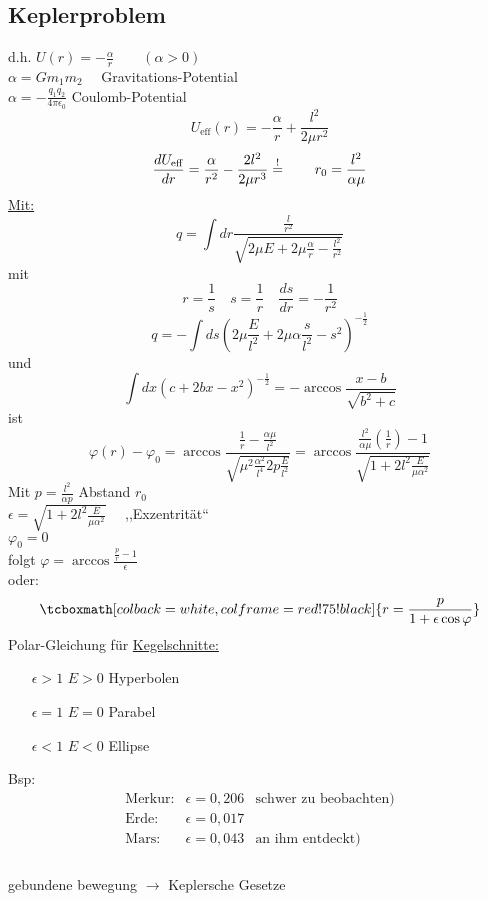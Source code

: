 \documentclass[titlepage,12pt,a4paper,ngerman]{report}
\newcommand{\tx}[1]{\textrm{#1}}
\newcommand{\rmbox}[1]{\tcboxmath[colback=white,colframe=red!75!black]{#1}} %
\renewcommand{\boxed}{\rmbox}
\begin{document}
{\subsection{Keplerproblem}
d.h. $U(r) = - \frac{\alpha}{r} \qquad (\alpha > 0)$\\
$ \alpha = G m_1 m_2 \quad  $  Gravitations-Potential\\
$ \alpha = - \frac{q_1 q_2}{4 \pi \epsilon_0} $ Coulomb-Potential\\
$$U_{\tx{eff}} (r) = -\frac{\alpha}{r} + \frac{l^2}{2 \mu r^2} $$
$$\frac{d U_{\tx{eff}}}{dr} = \frac{\alpha}{r^2} - \frac{2 l^2}{2 \mu r^3} \buildrel ! \over = \qquad r_0 = \frac{l^2}{\alpha \mu}$$
\underline{Mit:}
$$q = \int dr \frac{\frac{l}{r^2}}{\sqrt{2 \mu E + 2 \mu \frac{\alpha}{r} - \frac{l^2}{r^2}}}$$
mit
$$ r = \frac{1}{s} \quad s = \frac{1}{r} \quad \frac{ds}{dr} = - \frac{1}{r^2}$$
$$ q = - \int ds (2\mu \frac{E}{l^2} + 2 \mu \alpha \frac{s}{l^2} - s^2) ^{-\frac{1}{2}}$$
und 
$$ \int dx (c+2bx-x^2)^{-\frac{1}{2}} = - \arccos \frac{x-b}{\sqrt{b^2 + c}}$$
ist
$$ \varphi(r) - \varphi_0 = \arccos \frac{\frac{1}{r} - \frac{\alpha \mu}{l^2}}{\sqrt{\mu^2 \frac{\alpha^2}{l^4} 2 p \frac{E}{l^2}}} = \arccos \frac{\frac{l^2}{\alpha \mu} (\frac{1}{r}) - 1}{\sqrt{1+2l^2 \frac{E}{\mu \alpha^2}}}$$
Mit $ p = \frac{l^2}{\alpha p} $ Abstand $ r_0 $\\
$ \epsilon = \sqrt{1 + 2l^2 \frac{E}{\mu \alpha^2}} \quad$ ,,Exzentrität``\\
$ \varphi_0 = 0 $\\
folgt $  \varphi = \arccos\frac{\frac{p}{r}-1}{\epsilon} $\\
oder:
$$\boxed{ r = \frac{p}{1 + \epsilon \cos \varphi}}$$
Polar-Gleichung für \underline{Kegelschnitte:}
\begin{itemize}
	\item[$ \epsilon > 1 $] $ E>0 $ Hyperbolen
	\item[$ \epsilon = 1 $] $ E = 0 $ Parabel
	\item[$ \epsilon < 1 $] $ E<0 $ Ellipse
\end{itemize}
Bsp:
$$\begin{array}{lll}
\tx{Merkur:} &  \epsilon = 0,206  & \tx{schwer zu beobachten)}\\
\tx{Erde:} & \epsilon = 0,017 \\
\tx{Mars:} & \epsilon = 0,043 & \tx{an ihm entdeckt)}\\
\end{array}$$\\
gebundene bewegung $ \rightarrow $ Keplersche Gesetze
}
\end{document}
